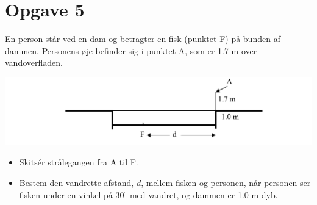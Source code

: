 \documentclass[a4paper, 12pt]{article}
\begin{document}
\newpage
\section*{Opgave 5}
\label{sec:orgae33945}

En person står ved en dam og betragter en fisk (punktet F) på bunden af dammen. Personens øje befinder sig i punktet A, som er 1.7 m over vandoverfladen.

\begin{center}
\includegraphics[width=.9\linewidth]{./img/dam.png}
\end{center}

\begin{itemize}
\item Skitsér strålegangen fra A til F.

\item Bestem den vandrette afstand, \(d\), mellem fisken og personen, når personen ser fisken under en vinkel på \(30^\circ\) med vandret, og dammen er 1.0 m dyb.
\end{itemize}
\end{document}
